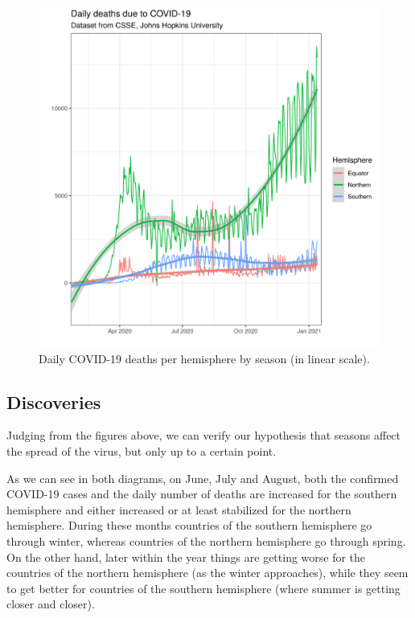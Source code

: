\begin{figure}[H]
\centering
\includegraphics[scale=0.9]{images/hem_series_daily_deaths.png}
\caption{Daily COVID-19 deaths per hemisphere by season (in linear scale).}
\label{fig:daily_deaths_time}
\end{figure}


\subsection{Discoveries}

Judging from the figures above, we can verify our hypothesis that seasons affect the spread of the virus, but only up to a certain point.

As we can see in both diagrams, on June, July and August, both the confirmed COVID-19 cases and the daily number of deaths are increased for the southern hemisphere and either increased or at least stabilized for the northern hemisphere.
During these months countries of the southern hemisphere go through winter, whereas countries of the northern hemisphere go through spring.
On the other hand, later within the year things are getting worse for the countries of the northern hemisphere (as the winter approaches), while they seem to get better for countries of the southern hemisphere (where summer is getting closer and closer).

